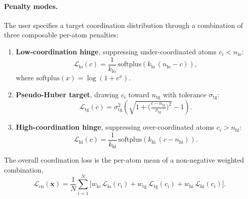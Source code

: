 \paragraph{Penalty modes.}
The user specifies a target coordination distribution through a combination
of three composable per-atom penalties:
\begin{enumerate}
    \item \textbf{Low-coordination hinge}, suppressing under-coordinated atoms
          $c_i<n_{\mathrm{lo}}$:
          \begin{equation}
              \mathcal{L}_{\mathrm{lo}}(c)
              = \frac{1}{k_{\mathrm{lo}}}\,\mathrm{softplus}\!\left(k_{\mathrm{lo}}\,(n_{\mathrm{lo}} - c)\right),
              \label{eq:loss-lo}
          \end{equation}
          where $\mathrm{softplus}(x)=\log(1+e^{x})$.
    \item \textbf{Pseudo-Huber target}, drawing $c_i$ toward $n_{\mathrm{tg}}$
          with tolerance $\sigma_{\mathrm{tg}}$:
          \begin{equation}
              \mathcal{L}_{\mathrm{tg}}(c)
              = \sigma_{\mathrm{tg}}^{2}\!\left(\sqrt{1+\Big(\tfrac{c - n_{\mathrm{tg}}}{\sigma_{\mathrm{tg}}}\Big)^{2}} - 1\right).
              \label{eq:loss-tg}
          \end{equation}
    \item \textbf{High-coordination hinge}, suppressing over-coordinated atoms
          $c_i>n_{\mathrm{hi}}$:
          \begin{equation}
              \mathcal{L}_{\mathrm{hi}}(c)
              = \frac{1}{k_{\mathrm{hi}}}\,\mathrm{softplus}\!\left(k_{\mathrm{hi}}\,(c - n_{\mathrm{hi}})\right).
              \label{eq:loss-hi}
          \end{equation}
\end{enumerate}
The overall coordination loss is the per-atom mean of a non-negative weighted
combination,
\begin{equation}
    \mathcal{L}_{\mathrm{cn}}(\mathbf{x})
    = \frac{1}{N}\sum_{i=1}^{N}
      \Big[
        w_{\mathrm{lo}}\,\mathcal{L}_{\mathrm{lo}}(c_i)
      + w_{\mathrm{tg}}\,\mathcal{L}_{\mathrm{tg}}(c_i)
      + w_{\mathrm{hi}}\,\mathcal{L}_{\mathrm{hi}}(c_i)
      \Big].
    \label{eq:loss-cn}
\end{equation}

